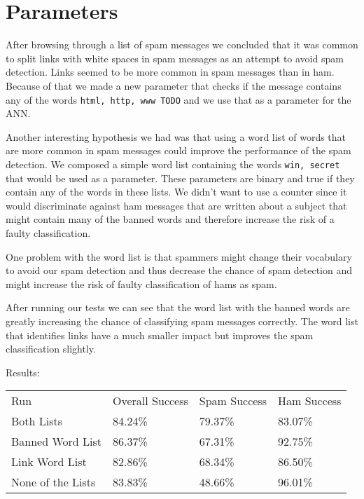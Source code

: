\section{Parameters}
After browsing through a list of spam messages we concluded that it was common
to split links with white spaces in spam messages as an attempt to avoid spam
detection. Links seemed to be more common in spam messages than in ham. Because
of that we made a new parameter that checks if the message contains any of the
words \texttt{html, http, www TODO} and we use that as a parameter for the ANN. 

Another interesting hypothesis we had was that using a word list of words that
are more common in spam messages could improve the performance of the spam
detection. We composed a simple word list containing the words \texttt{win,
secret} that would be used as a parameter.  These parameters are binary and
true if they contain any of the words in these lists. We didn't want to use a
counter since it would discriminate against ham messages that are written about
a subject that might contain many of the banned words and therefore increase
the risk of a faulty classification. 

One problem with the word list is that spammers might change their vocabulary
to avoid our spam detection and thus decrease the chance of spam detection and
might increase the risk of faulty classification of hams as spam. 

After running our tests we can see that the word list with the banned words are
greatly increasing the chance of classifying spam messages correctly. The word
list that identifies links have a much smaller impact but improves the spam
classification slightly. 

Results:
\begin{table}[h]
\begin{tabular}{llll}
Run               & Overall Success & Spam Success & Ham Success \\
Both Lists        & 84.24\%         & 79.37\%      & 83.07\%     \\
Banned Word List  & 86.37\%         & 67.31\%      & 92.75\%     \\
Link Word List    & 82.86\%         & 68.34\%      & 86.50\%     \\
None of the Lists & 83.83\%         & 48.66\%      & 96.01\%    
\end{tabular}
\end{table}
